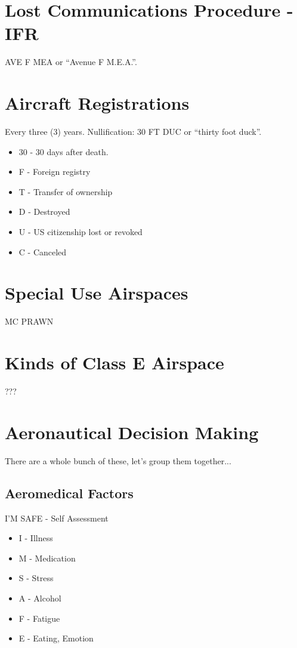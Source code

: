 \section{Lost Communications Procedure - IFR}

AVE F MEA or ``Avenue F M.E.A.''.

\section{Aircraft Registrations}

Every three (3) years. Nullification: 30 FT DUC or ``thirty foot duck''.

\begin{itemize}
\item 30 - 30 days after death.
\item F - Foreign registry
\item T - Transfer of ownership
\item D - Destroyed
\item U - US citizenship lost or revoked
\item C - Canceled
\end{itemize}

\section{Special Use Airspaces}

MC PRAWN

\section{Kinds of Class E Airspace}

???

\section{Aeronautical Decision Making}

There are a whole bunch of these, let's group them together...

\subsection{Aeromedical Factors}

I'M SAFE - Self Assessment

\begin{itemize}
    \item I - Illness
    \item M - Medication
    \item S - Stress
    \item A - Alcohol
    \item F - Fatigue
    \item E - Eating, Emotion
\end{itemize}

